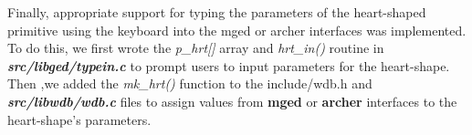 Finally,   appropriate   support   for   typing   the   parameters   of   the   heart­-shaped  
primitive   using   the   keyboard   into   the   mged   or   archer   interfaces   was  
implemented.   To   do   this,   we   first   wrote   the   \textit{p\_hrt[]}   array   and   \textit{hrt\_in()}   routine   in  
\textit{\textbf{src/libged/typein.c}}   to   prompt   users   to   input   parameters   for   the   heart­-shape.  
Then ,we   added   the   \textit{mk\_hrt()}   function   to   the   include/wdb.h   and  \textit{\textbf{src/libwdb/wdb.c}} files   to   assign   values   from   \textbf{mged}   or   \textbf{archer}   interfaces   to   the  heart-shape's parameters.
 
